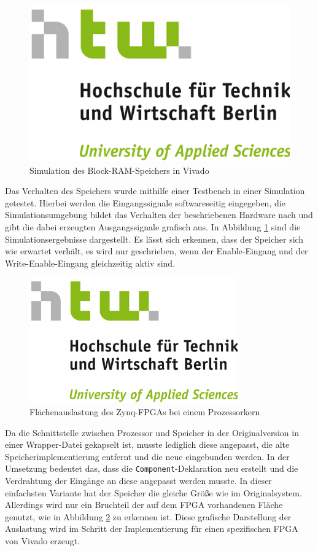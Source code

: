 \documentclass[11pt,a4paper,titlepage]{article}
\begin{document}
\begin{figure}[!ht]
\includegraphics[width=\textwidth]{images/htw_hochschule.png}
\caption{Simulation des Block-RAM-Speichers in Vivado}
\label{img:BRAM_sim}
\end{figure}

Das Verhalten des Speichers wurde mithilfe einer Testbench in einer Simulation getestet. Hierbei werden die Eingangssignale softwareseitig eingegeben, die Simulationsumgebung bildet das Verhalten der beschriebenen Hardware nach und gibt die dabei erzeugten Ausgangssignale grafisch aus. In Abbildung \ref{img:BRAM_sim} sind die Simulationsergebnisse dargestellt. Es lässt sich erkennen, dass der Speicher sich wie erwartet verhält, es wird nur geschrieben, wenn der Enable-Eingang und der Write-Enable-Eingang gleichzeitig aktiv sind.

\begin{figure}[!ht]
\centering
\includegraphics[width=0.8\textwidth]{images/htw_hochschule.png}
\caption{Flächenauslastung des Zynq-FPGAs bei einem Prozessorkern}
\label{img:FPGA_Flaeche_1}
\end{figure}

Da die Schnittstelle zwischen Prozessor und Speicher in der Originalversion in einer Wrapper-Datei gekapselt ist, musste lediglich diese angepasst, die alte Speicherimplementierung entfernt und die neue eingebunden werden. In der Umsetzung bedeutet das, dass die \verb+Component+-Deklaration neu erstellt und die Verdrahtung der Eingänge an diese angepasst werden musste. In dieser einfachsten Variante hat der Speicher die gleiche Größe wie im Originalsystem. Allerdings wird nur ein Bruchteil der auf dem FPGA vorhandenen Fläche genutzt, wie in Abbildung \ref{img:FPGA_Flaeche_1} zu erkennen ist. Diese grafische Darstellung der Auslastung wird im Schritt der Implementierung für einen spezifischen FPGA von Vivado erzeugt.
\end{document}
